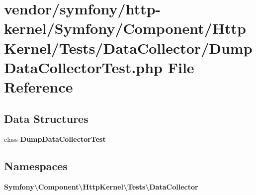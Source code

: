 \section{vendor/symfony/http-\/kernel/\+Symfony/\+Component/\+Http\+Kernel/\+Tests/\+Data\+Collector/\+Dump\+Data\+Collector\+Test.php File Reference}
\label{_dump_data_collector_test_8php}
\subsection*{Data Structures}
\begin{DoxyCompactItemize}
\item 
class {\bf Dump\+Data\+Collector\+Test}
\end{DoxyCompactItemize}
\subsection*{Namespaces}
\begin{DoxyCompactItemize}
\item 
 {\bf Symfony\textbackslash{}\+Component\textbackslash{}\+Http\+Kernel\textbackslash{}\+Tests\textbackslash{}\+Data\+Collector}
\end{DoxyCompactItemize}
